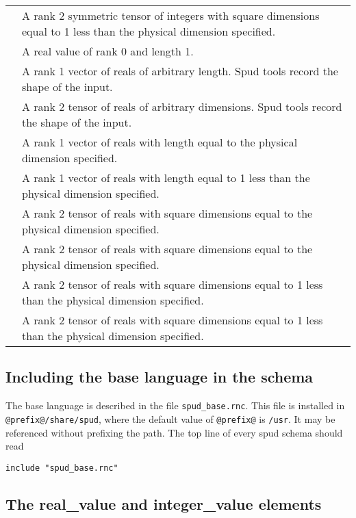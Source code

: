 \documentclass[a4paper, 11pt]{book}
\begin{document}
\begin{longtable}{lp{8cm}}
\lstinline*integer_dim_minus_one_symmetric_tensor* & A rank 2 symmetric tensor of integers with square dimensions equal to 1 less than the physical dimension specified. \\
\lstinline*real* & A real value of rank 0 and length 1. \\
\lstinline*real_vector* & A rank 1 vector of reals of arbitrary length.  Spud tools record the shape of the input. \\
\lstinline*real_tensor* & A rank 2 tensor of reals of arbitrary dimensions.  Spud tools record the shape of the input. \\
\lstinline*real_dim_vector* & A rank 1 vector of reals with length equal to the physical dimension specified. \\
\lstinline*real_dim_minus_one_vector* & A rank 1 vector of reals with length equal to 1 less than the physical dimension specified. \\
\lstinline*real_dim_tensor* & A rank 2 tensor of reals with square dimensions equal to the physical dimension specified. \\
\lstinline*real_dim_symmetric_tensor* & A rank 2 tensor of reals with square dimensions equal to the physical dimension specified. \\
\lstinline*real_dim_minus_one_tensor* & A rank 2 tensor of reals with square dimensions equal to 1 less than the physical dimension specified. \\
\lstinline*real_dim_minus_one_symmetric_tensor* & A rank 2 tensor of reals with square dimensions equal to 1 less than the physical dimension specified.
\end{longtable}

\subsection{Including the base language in the schema}
The base language is described in the file \verb+spud_base.rnc+.
This file is installed in \verb+@prefix@/share/spud+, where the default
value of \verb+@prefix@+ is \verb+/usr+. It may be referenced
without prefixing the path. The top line of every spud schema should read
\begin{verbatim}
include "spud_base.rnc"
\end{verbatim}

\subsection{The real\_value and integer\_value elements}
\end{document}

